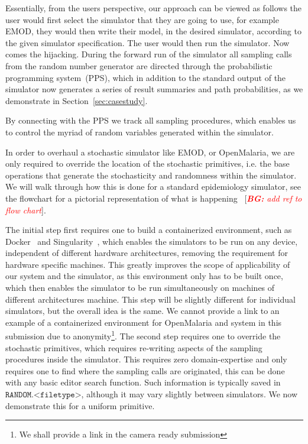\documentclass{article}
\newcommand{\bg}[1]{~{{[{\it \textcolor{red}{{\bf BG:} #1}}]}}}
\begin{document}
Essentially, from the users perspective, our approach can be viewed as follows the user would first select the simulator that they are going to use, for example EMOD, they would then write their model, in the desired simulator, according to the given simulator specification. The user would then run the simulator. Now comes the hijacking. During the forward run of the simulator all sampling calls from the random number generator are directed through the probabilistic programming system~(PPS), which in addition to the standard output of the simulator now generates a series of result summaries and path probabilities, as we demonstrate in Section~\ref{sec:casestudy}.

By connecting with the PPS we track all sampling procedures, which enables us to control the myriad of random variables generated within the simulator. 

In order to overhaul a stochastic simulator like EMOD, or OpenMalaria, we are only required to override the location of the stochastic primitives, i.e. the base operations that generate the stochasticity and randomness within the simulator. 
We will walk through how this is done for a standard epidemiology simulator, see the flowchart for a pictorial representation of what is happening \bg{add ref to flow chart}.

The initial step first requires one to build a containerized environment, such as Docker~\cite{merkel2014docker} and Singularity~\cite{kurtzer2017singularity}, which enables the simulators to be run on any device, independent of different hardware architectures, removing the requirement for hardware specific machines. 
This greatly improves the scope of applicability of our system and the simulator, as this environment only has to be built once, which then enables the simulator to be run simultaneously on machines of different architectures machine. This step will be slightly different for individual simulators, but the overall idea is the same. We cannot provide a link to an example of a containerized environment for OpenMalaria and system in this submission due to anonymity\footnote{We shall provide a link in the camera ready submission}.
The second step requires one to override the stochastic primitives, which requires re-writing aspects of the sampling procedures inside the simulator. 
This requires zero domain-expertise and only requires one to find where the sampling calls are originated, this can be done with any basic editor search function.
 Such information is typically saved in $\texttt{RANDOM.<filetype>}$, although it may vary slightly between simulators. We now demonstrate this for a uniform primitive.
\end{document}
